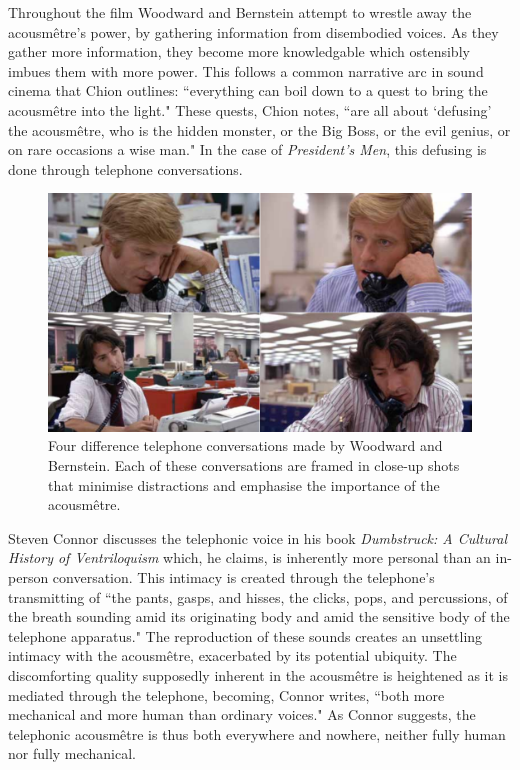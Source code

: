Throughout the film Woodward and Bernstein attempt to wrestle away the acousmêtre's power, by gathering information from disembodied voices.
As they gather more information, they become more knowledgable which ostensibly imbues them with more power.
This follows a common narrative arc in sound cinema that Chion outlines:
``everything can boil down to a quest to bring the acousmêtre into the light."\autocites[Chion uses the term ``acousmêtre" to define a figure that is heard but not yet seen.][23-24]{chion_voice_1999}
These quests, Chion notes, ``are all about `defusing' the acousmêtre, who is the hidden monster, or the Big Boss, or the evil genius, or on rare occasions a wise man."\autocites[][24]{chion_voice_1999}
In the case of \textit{President's Men}, this defusing is done through telephone conversations.
\begin{figure}
    \centering
    \includegraphics[width=1\linewidth]{img/president-phone-close.pdf}
    \caption{Four difference telephone conversations made by Woodward and Bernstein. Each of these conversations are framed in close-up shots that minimise distractions and emphasise the importance of the acousmêtre.}
    \label{fig:president-phone-close}
\end{figure}

Steven Connor discusses the telephonic voice in his book \textit{Dumbstruck: A Cultural History of Ventriloquism} which, he claims, is inherently more personal than an in-person conversation.
This intimacy is created through the telephone's transmitting of ``the pants, gasps, and hisses, the clicks, pops, and percussions, of the breath sounding amid its originating body and amid the sensitive body of the telephone apparatus."\autocites[][381]{connor_dumbstruck_2000}
The reproduction of these sounds creates an unsettling intimacy with the acousmêtre, exacerbated by its potential ubiquity.
The discomforting quality supposedly inherent in the acousmêtre is heightened as it is mediated through the telephone, becoming, Connor writes, ``both more mechanical and more human than ordinary voices."\autocites[][381]{connor_dumbstruck_2000}
As Connor suggests, the telephonic acousmêtre is thus both everywhere and nowhere, neither fully human nor fully mechanical.

